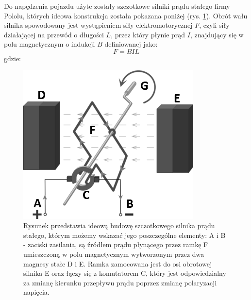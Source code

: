 Do napędzenia pojazdu użyte zostały szczotkowe silniki prądu stałego firmy Pololu, których ideowa konstrukcja została pokazana poniżej (rys. \ref{silnik_p}). Obrót wału silnika spowodowany jest wystąpieniem siły elektromotorycznej $F$, czyli siły działającej na przewód o długości $L$, przez który płynie prąd $I$, znajdujący się w polu magnetycznym o indukcji $B$ definiowanej jako:
\begin{equation}
	F =  BIL
   \label{eq:sila_elektromotoryczna}
 \end{equation}
 gdzie:  
 \begin{equationDescriptor}
 \end{equationDescriptor}
 \newpage
  \begin{figure}[H]
    \begin{center}
      \includegraphics[scale=0.7]{imgs/silnik_p_stalego.png}
 	\caption[Schemat ideowy silnika prądu stałego.]{\small{Rysunek przedstawia ideową budowę szczotkowego silnika prądu stałego, którym możemy wskazać jego poszczególne elementy: A i B - zaciski zasilania, są źródłem prądu płynącego przez ramkę F umieszczoną w polu magnetycznym wytworzonym przez dwa magnesy stałe D i E. Ramka zamocowana jest do osi obrotowej silnika E oraz łączy się z komutatorem C, który jest odpowiedzialny za zmianę kierunku przepływu prądu poprzez zmianę polaryzacji napięcia.}\footnotemark}
	\label{silnik_p}
    \end{center}
  \end{figure}  
